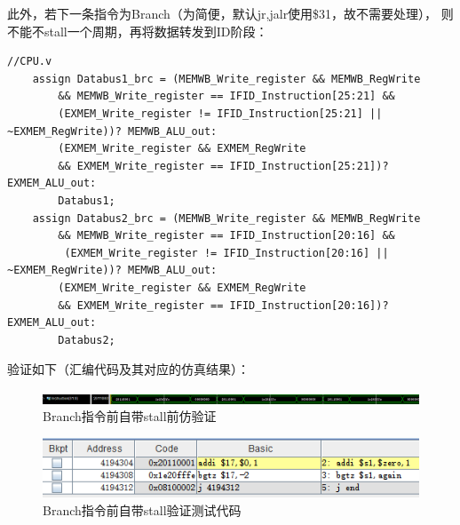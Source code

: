 \documentclass[10pt]{article}
\begin{document}
此外，若下一条指令为Branch（为简便，默认jr,jalr使用\$31，故不需要处理），
则不能不stall一个周期，再将数据转发到ID阶段：
\begin{lstlisting}[style={verilog-style}]
    //CPU.v
    assign Databus1_brc = (MEMWB_Write_register && MEMWB_RegWrite
        && MEMWB_Write_register == IFID_Instruction[25:21] && 
        (EXMEM_Write_register != IFID_Instruction[25:21] || ~EXMEM_RegWrite))? MEMWB_ALU_out:
        (EXMEM_Write_register && EXMEM_RegWrite
        && EXMEM_Write_register == IFID_Instruction[25:21])? EXMEM_ALU_out:
        Databus1;
    assign Databus2_brc = (MEMWB_Write_register && MEMWB_RegWrite
        && MEMWB_Write_register == IFID_Instruction[20:16] &&
         (EXMEM_Write_register != IFID_Instruction[20:16] || ~EXMEM_RegWrite))? MEMWB_ALU_out:
        (EXMEM_Write_register && EXMEM_RegWrite
        && EXMEM_Write_register == IFID_Instruction[20:16])? EXMEM_ALU_out:
        Databus2;
\end{lstlisting}

验证如下（汇编代码及其对应的仿真结果）：
\begin{figure}[H]
    \centering
    \includegraphics[scale=0.4]{bgtzz.png}
    \caption{Branch指令前自带stall前仿验证}
    \end{figure}
    \begin{figure}[H]
        \centering
        \includegraphics[scale=0.9]{bgtz.png}
        \caption{Branch指令前自带stall验证测试代码}
        \end{figure}
\end{document}

